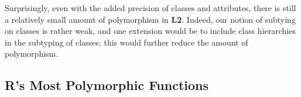 \documentclass[acmsmall,10pt,review,anonymous]{acmart}\settopmatter{printfolios=true,printccs=false,printacmref=false}
\begin{document}
Surprisingly, even with the added precision of classes and attributes, there is still a relatively small amount of polymorphism in {\bf L2}.
Indeed, our notion of subtying on classes is rather weak, and one extension would be to include class hierarchies in the subtyping of classes;
this would further reduce the amount of polymorphism.

%
%
%

%
%
%
%
\subsection{R's Most Polymorphic Functions}
\end{document}
